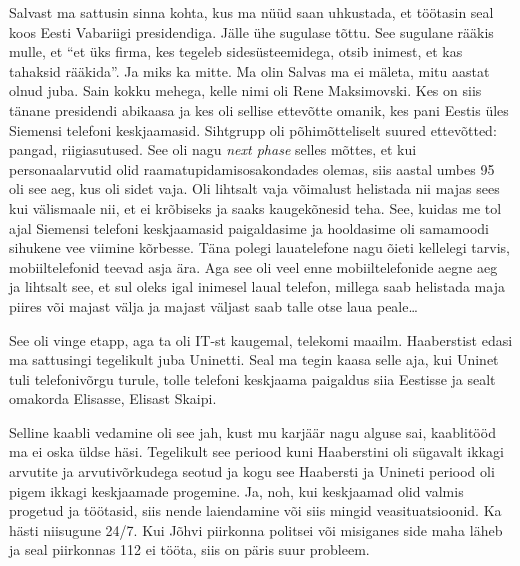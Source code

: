 Salvast ma sattusin sinna kohta, kus ma nüüd saan uhkustada, et  töötasin seal koos Eesti Vabariigi presidendiga. Jälle ühe sugulase tõttu. See sugulane rääkis mulle, et \enquote{et üks firma, kes tegeleb sidesüsteemidega, otsib inimest, et kas tahaksid rääkida}. Ja miks ka mitte. Ma olin Salvas ma ei mäleta, mitu aastat olnud juba. Sain kokku mehega, kelle nimi oli Rene Maksimovski. Kes on siis tänane presidendi abikaasa ja kes oli  sellise ettevõtte omanik, kes pani Eestis üles Siemensi telefoni keskjaamasid. Sihtgrupp oli põhimõtteliselt suured ettevõtted: pangad, riigiasutused. See oli nagu \emph{next phase} selles mõttes, et kui personaalarvutid olid raamatupidamisosakondades olemas, siis aastal umbes 95 oli see aeg, kus oli sidet vaja. Oli lihtsalt vaja võimalust helistada nii majas sees kui välismaale nii, et ei krõbiseks ja saaks kaugekõnesid teha. See, kuidas me tol ajal Siemensi telefoni keskjaamasid paigaldasime ja hooldasime oli samamoodi sihukene vee viimine kõrbesse. Täna polegi lauatelefone nagu õieti kellelegi tarvis, mobiiltelefonid teevad asja ära. Aga see oli veel enne mobiiltelefonide aegne aeg ja lihtsalt see, et sul oleks igal inimesel laual telefon, millega saab helistada maja piires või majast välja ja majast väljast saab talle otse laua peale\ldots 


See oli vinge etapp, aga ta oli IT-st kaugemal, telekomi maailm. Haaberstist edasi ma sattusingi tegelikult juba Uninetti. Seal ma tegin kaasa selle aja, kui Uninet tuli telefonivõrgu turule, tolle telefoni keskjaama paigaldus siia Eestisse ja sealt omakorda Elisasse, Elisast Skaipi. 


Selline kaabli vedamine oli see jah, kust mu karjäär nagu alguse sai, kaablitööd ma ei oska üldse häsi. Tegelikult see periood kuni Haaberstini oli sügavalt ikkagi arvutite ja arvutivõrkudega  seotud ja kogu see Haabersti ja Unineti periood oli pigem ikkagi keskjaamade progemine. Ja, noh, kui keskjaamad olid valmis progetud ja töötasid, siis nende laiendamine või siis mingid veasituatsioonid. Ka hästi niisugune 24/7. Kui Jõhvi piirkonna politsei või misiganes side maha läheb ja seal piirkonnas 112 ei tööta, siis on päris suur probleem. 

